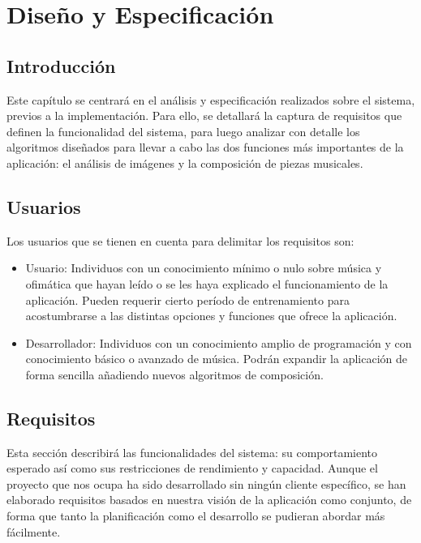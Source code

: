 \chapter{Diseño y Especificación}
\label{chap:diseno}


\section{Introducción}

Este capítulo se centrará en el análisis y especificación realizados sobre el sistema, previos a la implementación. Para ello, se detallará la captura de requisitos que definen la funcionalidad del sistema, para luego analizar con detalle los algoritmos diseñados para llevar a cabo las dos funciones más importantes de la aplicación: el análisis de imágenes y la composición de piezas musicales.

\section{Usuarios}
\label{sec:users}
	Los usuarios que se tienen en cuenta para delimitar los requisitos son:
	
	\begin{itemize}
		\item Usuario: Individuos con un conocimiento mínimo o nulo sobre música y ofimática que hayan leído o se les haya explicado el funcionamiento de la aplicación. Pueden requerir cierto período de entrenamiento para acostumbrarse a las distintas opciones y funciones que ofrece la aplicación.
		\item Desarrollador: Individuos con un conocimiento amplio de programación y con conocimiento básico o avanzado de música. Podrán expandir la aplicación de forma sencilla añadiendo nuevos algoritmos de composición.
		
	\end{itemize}


\section{Requisitos}
\label{sec:requisitos}
	Esta sección describirá las funcionalidades del sistema: su comportamiento esperado así como sus restricciones de rendimiento y capacidad. Aunque el proyecto que nos ocupa ha sido desarrollado sin ningún cliente específico, se han elaborado requisitos basados en nuestra visión de la aplicación como conjunto, de forma que tanto la planificación como el desarrollo se pudieran abordar más fácilmente.\\
	

